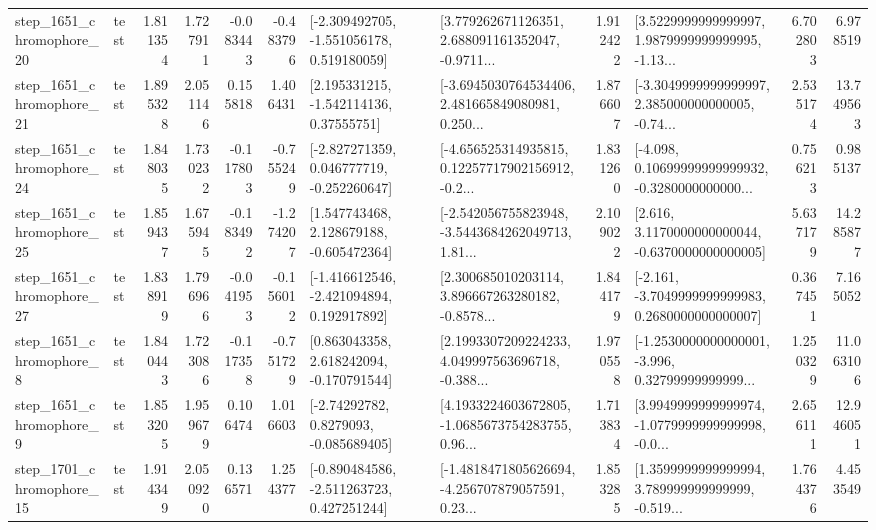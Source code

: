 \begin{tabular}{llrrrrllrlrr}
 step\_1651\_chromophore\_20 &      test &      1.811354 &    1.727911 &     -0.083443 & -0.483796 &   [-2.309492705, -1.551056178, 0.519180059] &  [3.779262671126351, 2.688091161352047, -0.9711... &       1.912422 &  [3.5229999999999997, 1.9879999999999995, -1.13... &            6.702803 &          6.978519 \\
 step\_1651\_chromophore\_21 &      test &      1.895328 &    2.051146 &      0.155818 &  1.406431 &     [2.195331215, -1.542114136, 0.37555751] &  [-3.6945030764534406, 2.481665849080981, 0.250... &       1.876607 &  [-3.3049999999999997, 2.385000000000005, -0.74... &            2.535174 &         13.749563 \\
 step\_1651\_chromophore\_24 &      test &      1.848035 &    1.730232 &     -0.117803 & -0.755249 &   [-2.827271359, 0.046777719, -0.252260647] &  [-4.656525314935815, 0.12257717902156912, -0.2... &       1.831260 &  [-4.098, 0.10699999999999932, -0.3280000000000... &            0.756213 &          0.985137 \\
 step\_1651\_chromophore\_25 &      test &      1.859437 &    1.675945 &     -0.183492 & -1.274207 &    [1.547743468, 2.128679188, -0.605472364] &  [-2.542056755823948, -3.5443684262049713, 1.81... &       2.109022 &   [2.616, 3.1170000000000044, -0.6370000000000005] &            5.637179 &         14.285877 \\
 step\_1651\_chromophore\_27 &      test &      1.838919 &    1.796966 &     -0.041953 & -0.156012 &   [-1.416612546, -2.421094894, 0.192917892] &  [2.300685010203114, 3.896667263280182, -0.8578... &       1.844179 &  [-2.161, -3.7049999999999983, 0.2680000000000007] &            0.367451 &          7.165052 \\
  step\_1651\_chromophore\_8 &      test &      1.840443 &    1.723086 &     -0.117358 & -0.751729 &    [0.863043358, 2.618242094, -0.170791544] &  [2.1993307209224233, 4.049997563696718, -0.388... &       1.970558 &  [-1.2530000000000001, -3.996, 0.32799999999999... &            1.250329 &         11.063106 \\
  step\_1651\_chromophore\_9 &      test &      1.853205 &    1.959679 &      0.106474 &  1.016603 &      [-2.74292782, 0.8279093, -0.085689405] &  [4.1933224603672805, -1.0685673754283755, 0.96... &       1.713834 &  [3.9949999999999974, -1.0779999999999998, -0.0... &            2.656111 &         12.946051 \\
 step\_1701\_chromophore\_15 &      test &      1.914349 &    2.050920 &      0.136571 &  1.254377 &   [-0.890484586, -2.511263723, 0.427251244] &  [-1.4818471805626694, -4.256707879057591, 0.23... &       1.853285 &  [1.3599999999999994, 3.789999999999999, -0.519... &            1.764376 &          4.453549 \\

\end{tabular}
